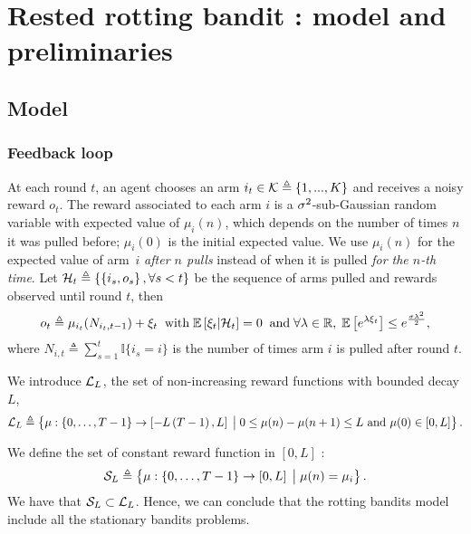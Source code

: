 

\section{Rested rotting bandit : model and preliminaries}
\label{Model}
\subsection{Model}
\subsubsection*{Feedback loop}
At each round $t$, an agent chooses an arm $i_t \in \mathcal{K} \triangleq \left\{ 1, ... , K\right\} $ and receives a noisy reward $o_t$. The reward associated to each arm $i$ is a $\sigma^2$-sub-Gaussian random variable with expected value of $\mu_i(n)$, which depends on the number of times $n$ it was pulled before; $\mu_i(0)$ is the initial expected value. %
We use $\mu_i(n)$ for the expected value of arm~$i$ \textit{after $n$ pulls} instead of when it is pulled \textit{for the $n$-th time}. 
Let $\mathcal{H}_t \triangleq \left\{ \left\{ i_s, o_s \right\}, \forall s < t \right\}$ be the sequence of arms pulled and rewards observed until round $t$, then 
%
\begin{align*}
o_{t} \triangleq \mu_{i_t}(N_{i_t,t-1}) + \xi_t
 \;\; \text{with}\; \mathbb{E}\left[ \xi_t | \mathcal{H}_t \right]= 0 \;\; \text{and} \; \forall \lambda \in \mathbb{R}, \; \mathbb{E}\left[ e^{\lambda\xi_t}\right] \leq e^{\frac{\sigma\lambda^2}{2}},
\end{align*}
%
where $N_{i,t}\triangleq \sum_{s=1}^{t} \mathbb{I}\{i_s = i\}$ is the number of times arm $i$ is pulled after round $t$. %
%
\begin{definition}\label{def:rew-bounded-decay} 
We introduce $\mathcal{L}_L$, the set of non-increasing reward functions with bounded decay $L$,
\[ 
\mathcal{L}_L \triangleq \left\{ \mu : \left\{0, \dots, T-1 \right\} \rightarrow \left[- L\left(T -1\right),  L\right] \;\big{|}\; 0 \leq \mu(n) - \mu(n+1)  \leq L \text{ and } \mu(0) \in \left[0,  L\right] \right\}.
\]
\end{definition}

\begin{remark}
\label{rem:stationary-is-rotting}
We define the set of constant reward function in $\left[0, L\right]$ : 
\[ 
\mathcal{S}_{L} \triangleq \left\{ \mu : \left\{0, \dots, T-1 \right\} \rightarrow \left[0,  L\right] \;\big{|}\;  \mu(n) = \mu_i  \right\}.
\]
We have that $\mathcal{S}_{L} \subset \mathcal{L}_L$. Hence, we can conclude that the rotting bandits model include all the stationary bandits problems.
\end{remark}

